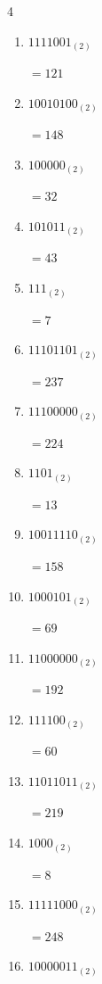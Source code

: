 \begin{multicols}{4}
\begin{enumerate}
        $=162$

  \item $1111001_{(2)}$

        $=121$

  \item $10010100_{(2)}$

        $=148$

  \item $100000_{(2)}$

        $=32$

  \item $101011_{(2)}$

        $=43$

  \item $111_{(2)}$

        $=7$

  \item $11101101_{(2)}$

        $=237$

  \item $11100000_{(2)}$

        $=224$

  \item $1101_{(2)}$

        $=13$

  \item $10011110_{(2)}$

        $=158$

  \item $1000101_{(2)}$

        $=69$

  \item $11000000_{(2)}$

        $=192$

\columnbreak %

  \item $111100_{(2)}$

        $=60$

  \item $11011011_{(2)}$

        $=219$

  \item $1000_{(2)}$

        $=8$

  \item $11111000_{(2)}$

        $=248$

  \item $10000011_{(2)}$


\end{enumerate}
\end{multicols}
